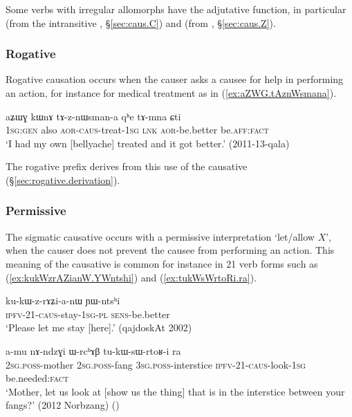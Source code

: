 Some verbs with irregular allomorphs have the adjutative function, in  particular  (from the intransitive , §\ref{sec:caus.C}) and   (from , §\ref{sec:caus.Z}).

\subsubsection{Rogative} \label{sec:sig.caus.rogative}
Rogative causation occurs when the causer asks a causee for help in performing an action, for instance for medical treatment as in (\ref{ex:aZWG.tAznWsmana}). 

\begin{exe}
\ex \label{ex:aZWG.tAznWsmana}
\gll aʑɯɣ kɯnɤ tɤ-z-nɯsman-a qʰe tɤ-mna ɕti \\
\textsc{1sg}:\textsc{gen} also \textsc{aor}-\textsc{caus}-treat-\textsc{1sg} \textsc{lnk} \textsc{aor}-be.better be.\textsc{aff}:\textsc{fact} \\
\glt `I had my own [bellyache] treated and it got better.' (2011-13-qala)
\end{exe}

The rogative  prefix derives from this use of the causative (§\ref{sec:rogative.derivation}). 

\subsubsection{Permissive} \label{sec:sig.caus.permissive} 
The sigmatic causative occurs with a permissive interpretation `let/allow $X$', when the causer does not prevent the causee from performing an action. This meaning of the causative is common for instance in 2\fl{}1 verb forms such as (\ref{ex:kukWzrAZianW.YWntshi}) and (\ref{ex:tukWsWrtoRi.ra}). 

\begin{exe}
\ex \label{ex:kukWzrAZianW.YWntshi}
\gll ku-kɯ-z-rɤʑi-a-nɯ ɲɯ-ntsʰi \\
\textsc{ipfv}-2\fl{}1-\textsc{caus}-stay-\textsc{1sg}-\textsc{pl} \textsc{sens}-be.better \\
\glt `Please let me stay [here].' (qajdoskAt 2002)
\end{exe}
 
\begin{exe}
\ex \label{ex:tukWsWrtoRi.ra}
\gll a-mu nɤ-ndzɣi ɯ-rcʰɤβ tu-kɯ-sɯ-rtoʁ-i ra \\
\textsc{2sg}.\textsc{poss}-mother \textsc{2sg}.\textsc{poss}-fang \textsc{3sg}.\textsc{poss}-interstice \textsc{ipfv}-2\fl{}1-\textsc{caus}-look-\textsc{1sg} be.needed:\textsc{fact} \\
\glt `Mother, let us look at [show us the thing] that is in the interstice between your fangs?' (2012 Norbzang)
()
\end{exe}

